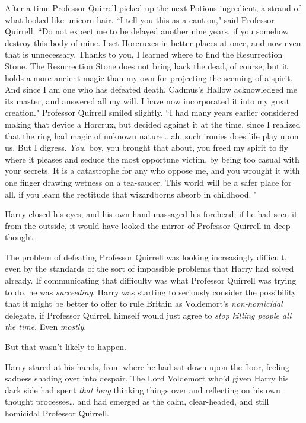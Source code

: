 After a time Professor Quirrell picked up the next Potions ingredient, a strand of what looked like unicorn hair. ``I tell you this as a caution," said Professor Quirrell. ``Do not expect me to be delayed another nine years, if you somehow destroy this body of mine. I set Horcruxes in better places at once, and now even that is unnecessary. Thanks to you, I learned where to find the Resurrection Stone. The Resurrection Stone does not bring back the dead, of course; but it holds a more ancient magic than my own for projecting the seeming of a spirit. And since I am one who has defeated death, Cadmus's Hallow acknowledged me its master, and answered all my will. I have now incorporated it into my great creation." Professor Quirrell smiled slightly. ``I had many years earlier considered making that device a Horcrux, but decided against it at the time, since I realized that the ring had magic of unknown nature{\ldots} ah, such ironies does life play upon us. But I digress. \emph{You}, boy, you brought that about, you freed my spirit to fly where it pleases and seduce the most opportune victim, by being too casual with your secrets. It is a catastrophe for any who oppose me, and you wrought it with one finger drawing wetness on a tea-saucer. This world will be a safer place for all, if you learn the rectitude that wizardborns absorb in childhood. "

Harry closed his eyes, and his own hand massaged his forehead; if he had seen it from the outside, it would have looked the mirror of Professor Quirrell in deep thought.

The problem of defeating Professor Quirrell was looking increasingly difficult, even by the standards of the sort of impossible problems that Harry had solved already. If communicating that difficulty was what Professor Quirrell was trying to do, he was \emph{succeeding}. Harry was starting to seriously consider the possibility that it might be better to offer to rule Britain as Voldemort's \emph{non-homicidal} delegate, if Professor Quirrell himself would just agree to \emph{stop killing people all the time}. Even \emph{mostly}.

But that wasn't likely to happen.

Harry stared at his hands, from where he had sat down upon the floor, feeling sadness shading over into despair. The Lord Voldemort who'd given Harry his dark side had spent \emph{that long} thinking things over and reflecting on his own thought processes{\ldots} and had emerged as the calm, clear-headed, and still homicidal Professor Quirrell.

